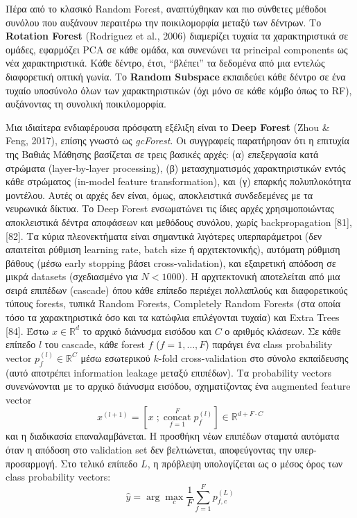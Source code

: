 Πέρα από το κλασικό Random Forest, αναπτύχθηκαν και πιο σύνθετες μέθοδοι συνόλου που αυξάνουν περαιτέρω την ποικιλομορφία μεταξύ των δέντρων. Το \textbf{Rotation Forest} (Rodriguez et al., 2006) διαμερίζει τυχαία τα χαρακτηριστικά σε ομάδες, εφαρμόζει PCA σε κάθε ομάδα, και συνενώνει τα principal components ως νέα χαρακτηριστικά. Κάθε δέντρο, έτσι, ``βλέπει'' τα δεδομένα από μια εντελώς διαφορετική οπτική γωνία. Το \textbf{Random Subspace} εκπαιδεύει κάθε δέντρο σε ένα τυχαίο υποσύνολο όλων των χαρακτηριστικών (όχι μόνο σε κάθε κόμβο όπως το RF), αυξάνοντας τη συνολική ποικιλομορφία.

Μια ιδιαίτερα ενδιαφέρουσα πρόσφατη εξέλιξη είναι το \textbf{Deep Forest} (Zhou \& Feng, 2017), επίσης γνωστό ως \emph{gcForest}. Οι συγγραφείς παρατήρησαν ότι η επιτυχία της Βαθιάς Μάθησης βασίζεται σε τρεις βασικές αρχές: (α) επεξεργασία κατά στρώματα (layer-by-layer processing), (β) μετασχηματισμός χαρακτηριστικών εντός κάθε στρώματος (in-model feature transformation), και (γ) επαρκής πολυπλοκότητα μοντέλου. Αυτές οι αρχές δεν είναι, όμως, αποκλειστικά συνδεδεμένες με τα νευρωνικά δίκτυα. Το Deep Forest ενσωματώνει τις ίδιες αρχές χρησιμοποιώντας αποκλειστικά δέντρα αποφάσεων και μεθόδους συνόλου, χωρίς backpropagation [81], [82]. Τα κύρια πλεονεκτήματα είναι σημαντικά λιγότερες υπερπαράμετροι (δεν απαιτείται ρύθμιση learning rate, batch size ή αρχιτεκτονικής), αυτόματη ρύθμιση βάθους (μέσω early stopping βάσει cross-validation), και εξαιρετική απόδοση σε μικρά datasets (σχεδιασμένο για $N < 1000$). Η αρχιτεκτονική αποτελείται από μια σειρά επιπέδων (cascade) όπου κάθε επίπεδο περιέχει πολλαπλούς και διαφορετικούς τύπους forests, τυπικά Random Forests, Completely Random Forests (στα οποία τόσο τα χαρακτηριστικά όσο και τα κατώφλια επιλέγονται τυχαία) και Extra Trees [84]. Έστω $x \in \mathbb{R}^d$ το αρχικό διάνυσμα εισόδου και $C$ ο αριθμός κλάσεων. Σε κάθε επίπεδο $l$ του cascade, κάθε forest $f$ ($f = 1, \ldots, F$) παράγει ένα class probability vector $p_f^{(l)} \in \mathbb{R}^C$ μέσω εσωτερικού $k$-fold cross-validation στο σύνολο εκπαίδευσης (αυτό αποτρέπει information leakage μεταξύ επιπέδων). Τα probability vectors συνενώνονται με το αρχικό διάνυσμα εισόδου, σχηματίζοντας ένα augmented feature vector
$$x^{(l+1)} = \left[ x \; ; \; \underset{f=1}{\overset{F}{\text{concat}}} \; p_f^{(l)} \right] \in \mathbb{R}^{d + F \cdot C}$$
και η διαδικασία επαναλαμβάνεται. Η προσθήκη νέων επιπέδων σταματά αυτόματα όταν η απόδοση στο validation set δεν βελτιώνεται, αποφεύγοντας την υπερ-προσαρμογή. Στο τελικό επίπεδο $L$, η πρόβλεψη υπολογίζεται ως ο μέσος όρος των class probability vectors:
$$\hat{y} = \arg\max_c \frac{1}{F} \sum_{f=1}^{F} p_{f,c}^{(L)}$$

